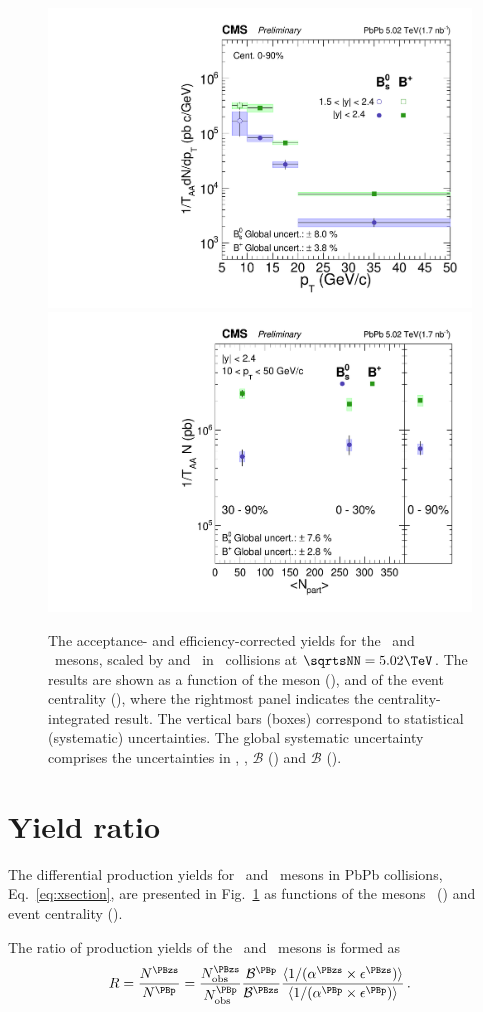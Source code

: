 \begin{figure}[t]
\centering
\includegraphics[width=.48\textwidth]{xsect_vsPt.pdf}
\includegraphics[width=.48\textwidth]{xsect_vsCent.pdf}
\caption{The acceptance- and efficiency-corrected yields for the \PBp\  and \PBzs\ mesons, scaled by \TAA and \NMB\ in \PbPb\ collisions at $\sqrtsNN=5.02\TeV$. The results are shown as a function of the meson \pt (\cmsLeft), and of the event centrality (\cmsRight), where the rightmost panel indicates the centrality-integrated result.  The vertical bars (boxes) correspond to statistical (systematic) uncertainties. The global systematic uncertainty comprises the uncertainties in \TAA, \NMB, $\mathcal{B}$ (\cmsLeft) and $\mathcal{B}$ (\cmsRight).
}
\label{fig:xsections}
\end{figure}



\section{Yield ratio}

The differential production yields for \PBzs\ and \PBp\ mesons in PbPb collisions, Eq.~\ref{eq:xsection}, 
are presented in Fig.~\ref{fig:xsections} as functions of the mesons \pt\ (\cmsLeft) and event centrality (\cmsRight).

The ratio of production yields of the \PBzs\ and \PBp\ mesons
is formed as
%
\begin{equation}
R = \frac{N^{\PBzs}}{N^{\PBp}} = 
\frac{N_{\rm{obs}}^{\PBzs}}{N_{\rm{obs}}^{\PBp}}
\frac{ \mathcal{B}^{\PBp}}{ \mathcal{B}^{\PBzs}} 
\frac{\langle 1/(\alpha^{\PBzs} \times \epsilon^{\PBzs})\rangle}
     {\langle 1/(\alpha^{\PBp}  \times \epsilon^{\PBp} )\rangle}
\, .
\label{eq:ratio}
\end{equation}
%


